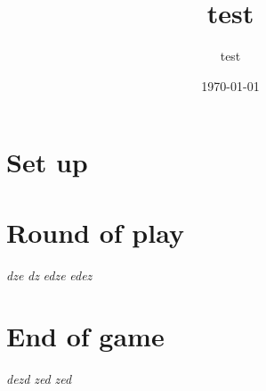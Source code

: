 \documentclass{article}%
\title{test}%
\author{test}%
\date{\today}%
\begin{document}
%
\pagestyle{empty}%
\normalsize%
\maketitle%
\section{ Set up
}%
\label{sec:Setup}%

%
\section{ Round of play
}%
\label{sec:Roundofplay}%
\textit{ dze
}%
\textit{ dz
}%
\textit{ edze
}%
\textit{ edez
}

%
\section{ End of game
}%
\label{sec:Endofgame}%
\textit{ dezd
}%
\textit{ zed
}%
\textit{ zed}

%
\end{document}

